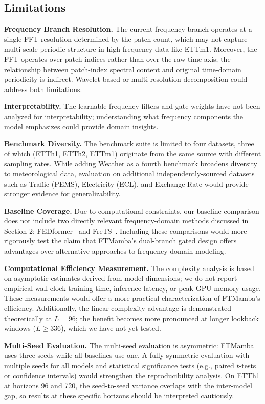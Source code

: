 \documentclass[electronics,article,submit,pdftex,moreauthors]{Definitions/mdpi}
\begin{document}
\subsection{Limitations}\label{sec:limitations}

\textbf{Frequency Branch Resolution.} The current frequency branch operates at a single FFT resolution determined by the patch count, which may not capture multi-scale periodic structure in high-frequency data like ETTm1. Moreover, the FFT operates over patch indices rather than over the raw time axis; the relationship between patch-index spectral content and original time-domain periodicity is indirect. Wavelet-based or multi-resolution decomposition could address both limitations.

\textbf{Interpretability.} The learnable frequency filters and gate weights have not been analyzed for interpretability; understanding what frequency components the model emphasizes could provide domain insights.

\textbf{Benchmark Diversity.} The benchmark suite is limited to four datasets, three of which (ETTh1, ETTh2, ETTm1) originate from the same source with different sampling rates. While adding Weather as a fourth benchmark broadens diversity to meteorological data, evaluation on additional independently-sourced datasets such as Traffic (PEMS), Electricity (ECL), and Exchange Rate would provide stronger evidence for generalizability.

\textbf{Baseline Coverage.} Due to computational constraints, our baseline comparison does not include two directly relevant frequency-domain methods discussed in Section 2: FEDformer~\cite{ref7} and FreTS~\cite{ref16}. Including these comparisons would more rigorously test the claim that FTMamba's dual-branch gated design offers advantages over alternative approaches to frequency-domain modeling.

\textbf{Computational Efficiency Measurement.} The complexity analysis is based on asymptotic estimates derived from model dimensions; we do not report empirical wall-clock training time, inference latency, or peak GPU memory usage. These measurements would offer a more practical characterization of FTMamba's efficiency. Additionally, the linear-complexity advantage is demonstrated theoretically at $L=96$; the benefit becomes more pronounced at longer lookback windows ($L \ge 336$), which we have not yet tested.

\textbf{Multi-Seed Evaluation.} The multi-seed evaluation is asymmetric: FTMamba uses three seeds while all baselines use one. A fully symmetric evaluation with multiple seeds for all models and statistical significance tests (e.g., paired $t$-tests or confidence intervals) would strengthen the reproducibility analysis. On ETTh1 at horizons 96 and 720, the seed-to-seed variance overlaps with the inter-model gap, so results at these specific horizons should be interpreted cautiously.
\end{document}
